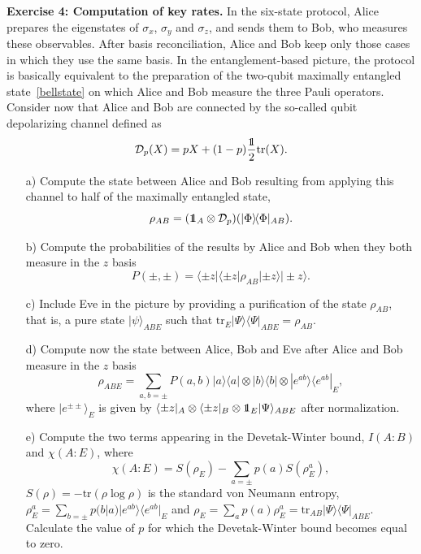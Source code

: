 \documentclass[a4paper]{article}
\def\tr{\mbox{tr}}
\def\one{\leavevmode\hbox{\small1\normalsize\kern-.33em1}}
\def\bra#1{\langle#1|} \def\ket#1{|#1\rangle}
\def\proj#1{\ket{#1}\!\bra{#1}}
\begin{document}
\textbf{Exercise 4: Computation of key rates.} In the six-state protocol, Alice prepares the eigenstates of $\sigma_x$, $\sigma_y$ and $\sigma_z$, and sends them to Bob, who measures these observables. After basis reconciliation, Alice and Bob keep only those cases in which they use the same basis. In the entanglement-based picture, the protocol is basically equivalent to the preparation of the two-qubit maximally entangled state~\eqref{bellstate} on which Alice and Bob measure the three Pauli operators. Consider now that Alice and Bob are connected by the so-called qubit depolarizing channel defined as
\begin{equation}
\label{depchannel}
\mathcal D_p(X)=pX + (1-p)\frac{\one}{2}\tr(X) .
\end{equation}
\begin{itemize}
\item[a)] Compute the state between Alice and Bob resulting from applying this channel to half of the maximally entangled state, 
\begin{equation}
\rho_{AB}=(\one_A\otimes\mathcal D_p)(\proj{\Phi}_{AB}).
\end{equation}
\item[b)] Compute the probabilities of the results by Alice and Bob when they both measure in the $z$ basis
\begin{equation}
P(\pm,\pm)=\bra{\pm z}\bra{\pm z}\rho_{AB} \ket{\pm z}\ket{\pm z} .
\end{equation}
\item[c)] Include Eve in the picture by providing a purification of the state $\rho_{AB}$, that is, a pure state $\ket{\psi}_{ABE}$ such that $\tr_E\proj{\Psi}_{ABE}=\rho_{AB}$.
\item[d)] Compute now the state between Alice, Bob and Eve after Alice and Bob measure in the $z$ basis
\begin{equation}
\rho_{ABE}=\sum_{a,b=\pm}P(a,b)\proj{a}\otimes\proj{b}\otimes\proj{e^{ab}}_E ,
\end{equation}
where $\ket{e^{\pm\pm}}_E$ is given by $\bra{\pm z}_A\otimes\bra{\pm z}_B\otimes\one_E\ket{\Psi}_{ABE}$ after normalization.
\item[e)] Compute the two terms appearing in the Devetak-Winter bound, $I(A:B)$ and $\chi(A:E)$, where 
\begin{equation}
\chi(A:E)=S(\rho_E)-\sum_{a=\pm}p(a)S(\rho^a_E), 
\end{equation}
$S(\rho)=-\tr(\rho\log\rho)$ is the standard von Neumann entropy, $\rho^a_E=\sum_{b=\pm}p(b|a)\proj{e^{ab}}_E$ and $\rho_E=\sum_a p(a)\rho^a_E=\tr_{AB}\proj{\Psi}_{ABE}$. Calculate the value of $p$ for which the Devetak-Winter bound becomes equal to zero.
\end{itemize}
\end{document}
